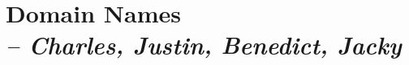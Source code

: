 \chapter[Domain Names]{Domain Names\\\small{\textit{-- Charles, Justin, Benedict, Jacky}}}
\label{Chapter::Domain Names}

